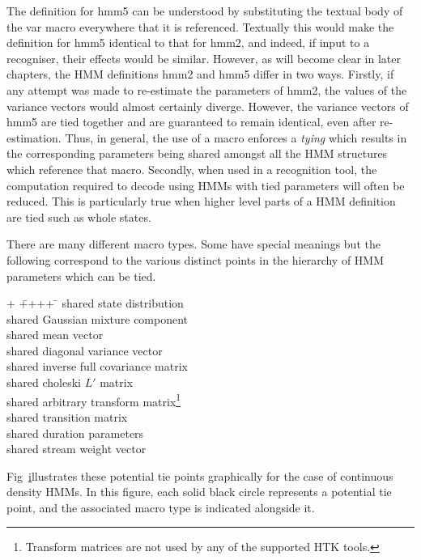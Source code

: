 The definition for \textsf{hmm5} can be understood by substituting
the textual body of the \textsf{var} macro everywhere that it is
referenced.  Textually this would make the definition for \textsf{hmm5}
identical to that for \textsf{hmm2}, and indeed, if input to a recogniser,
their effects would be similar.  
However, as will become clear in later chapters,
the HMM definitions \textsf{hmm2} and  \textsf{hmm5} differ
in two ways.  Firstly,  if
any attempt was made to re-estimate the parameters of \textsf{hmm2},
the values of the variance vectors would almost certainly
diverge.  However,
the variance vectors of \textsf{hmm5} are tied together and are
guaranteed to remain identical, even after re-estimation.  Thus,
in general, the use of a macro enforces a \textit{tying} which
results in the corresponding parameters being shared amongst
all the HMM structures which reference that macro.
Secondly, when used in a recognition tool, the computation required
to decode using HMMs with tied parameters will often be reduced.
This is particularly true when higher level parts of a HMM definition
are tied such as whole states.

There are many different macro types.  Some have special
meanings but the following correspond to
the various distinct points in the hierarchy of HMM parameters which
can be tied.  
\begin{tabbing}
+ \= ++++ \=  \kill
\>  \>  shared state distribution\\
\>  \>  shared Gaussian mixture component \\
\>  \>  shared mean vector \\
\>  \>  shared diagonal variance vector \\
\>  \>  shared inverse full covariance matrix \\
\>  \>  shared choleski $L'$ matrix \\
\>  \>  shared arbitrary transform matrix\footnote{
Transform matrices are not used by any of the supported HTK tools.
}
 \\
\>  \>  shared transition matrix \\
\>  \>  shared duration parameters \\
\>  \>  shared stream weight vector 
\end{tabbing}

Fig~\href{f:hierarch} illustrates these potential
tie points graphically for the case of continuous density HMMs.
In this figure, each solid black circle represents a potential
tie point, and the associated macro type is indicated alongside it.

